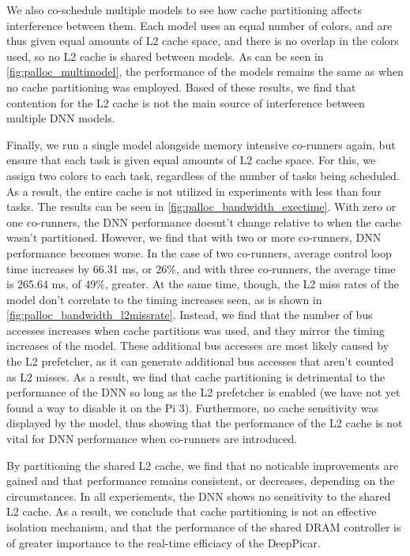 We also co-schedule multiple models to see how cache partitioning affects
interference between them. Each model uses an equal number of colors, and
are thus given equal amounts of L2 cache space, and there is no overlap
in the colors used, so no L2 cache is shared between models. As can be 
seen in \ref{fig:palloc_multimodel}, the performance of the models 
remains the same as when no cache partitioning was employed. Based of 
these results, we find that contention for the L2 cache is not the main
source of interference between multiple DNN models.

Finally, we run a single model alongside memory intensive co-runners 
again, but ensure that each task is given equal amounts of L2 cache space.
For this, we assign two colors to each task, regardless of the number of
tasks being scheduled. As a result, the entire cache is not utilized in
experiments with less than four tasks. The results can be seen in 
\ref{fig:palloc_bandwidth_exectime}. With zero or one co-runners, the DNN
performance doesnt't change relative to when the cache wasn't partitioned.
However, we find that with two or more co-runners, DNN performance becomes
worse. In the case of two co-runners, average control loop time increases
by 66.31 ms, or 26\%, and with three co-runners, the average time
is 265.64 ms, of 49\%, greater.
At the same time, though, the L2 miss rates of the model don't correlate 
to the timing increases seen, as is shown in 
\ref{fig:palloc_bandwidth_l2missrate}. Instead, we find that the number
of bus accesses increases when cache partitions was used, and they mirror
the timing increases of the model. These additional bus accesses are
most likely caused by the L2 prefetcher, as it can generate additional bus
accesses that aren't counted as L2 misses. As a result, we find that cache
partitioning is detrimental to the performance of the DNN so long as the 
L2 prefetcher is enabled (we have not yet found a way to disable it on
the Pi 3). Furthermore, no cache sensitivity was displayed by the model,
thus showing that the performance of the L2 cache is not vital for DNN 
performance when co-runners are introduced.

By partitioning the shared L2 cache, we find that no noticable 
improvements are gained and that performance remains consistent, or 
decreases, depending on the circumstances. In all experiements, the DNN
shows no sensitivity to the shared L2 cache. As a result, we conclude 
that cache partitioning is not an effective isolation mechanism, and that 
the performance of the shared DRAM controller is of greater importance 
to the real-time efficiacy of the DeepPicar.

